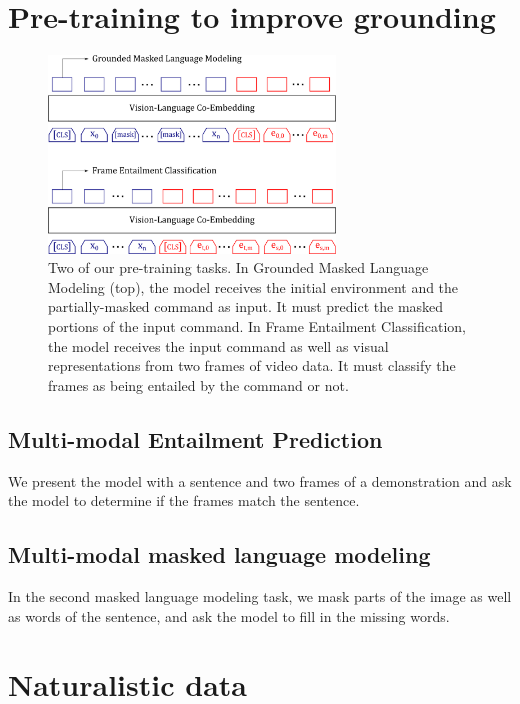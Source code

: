 \documentclass[11pt]{article}
\begin{document}
\section{Pre-training to improve grounding}
\begin{figure}
	\includegraphics[width=3in]{pre_training_model.png}
	\caption{Two of our pre-training tasks. 
	In Grounded Masked Language Modeling (top), the model receives the initial environment and the partially-masked command as input.
	It must predict the masked portions of the input command.
	In Frame Entailment Classification, the model receives the input command as well as visual representations from two frames of video data. 
	It must classify the frames as being entailed by the command or not.
}
	\label{fig:pre_training}	
\end{figure}

\subsection*{Multi-modal Entailment Prediction}
%
We present the model with a sentence and two frames of a demonstration and ask the model to determine if the frames match the sentence.

\subsection{Multi-modal masked language modeling}
%
In the second masked language modeling task, we mask parts of the image as well as words of the sentence, and ask the model to fill in the missing words.

\section{Naturalistic data}
\end{document}
